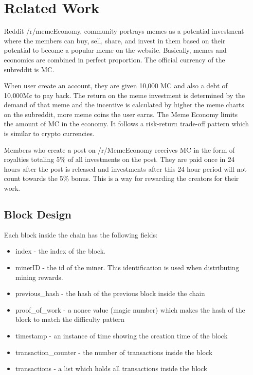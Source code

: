 \documentclass[12pt]{article}
\begin{document}
\section{Related Work} %
Reddit /r/memeEconomy, community portrays memes as a potential investment where the members can buy, sell, share, and invest in them based on their potential to become a popular meme on the website. Basically, memes and economics are combined in perfect proportion. The official currency of the subreddit is \ac{MC}.\par
\begin{flushleft}
When user create an account, they are given 10,000 \ac{MC} and also a debt of 10,000M¢ to pay back. The return on the meme investment is determined by the demand of that meme and the incentive is calculated by higher the meme charts on the subreddit, more meme coins the user earns. The Meme Economy limits the amount of \ac{MC} in the economy. It follows a risk-return trade-off pattern which is similar to crypto currencies.\par
\end{flushleft}
\begin{flushleft}
Members who create a post on /r/MemeEconomy receives \ac{MC} in the form of royalties totaling 5\% of all investments on the post. They are paid once in 24 hours after the post is released and investments after this 24 hour period will not count towards the 5\% bonus. This is a way for rewarding the creators for their work.
\end{flushleft}
\subsection{Block Design} %

Each block inside the chain has the following fields:

\begin{itemize}
  \item index - the index of the block.
  \item minerID - the id of the miner. This identification is used when distributing mining rewards.
  \item previous\_hash - the hash of the previous block inside the chain
  \item proof\_of\_work - a nonce value (magic number) which makes the hash of the block to match the difficulty pattern
  \item timestamp - an instance of time showing the creation time of the block
  \item transaction\_counter - the number of transactions inside the block
  \item transactions - a list which holds all transactions inside the block
\end{itemize}
\end{document}
